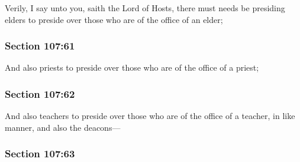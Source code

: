 		Verily, I say unto you, saith the Lord of Hosts, there must needs be presiding elders to preside over those who are of the office of an elder;


	\subsubsection{Section 107:61} %
		\label{DC107-61}

		And also priests to preside over those who are of the office of a priest;


	\subsubsection{Section 107:62} %
		\label{DC107-62}

		And also teachers to preside over those who are of the office of a teacher, in like manner, and also the deacons---


	\subsubsection{Section 107:63} %
		\label{DC107-63}

